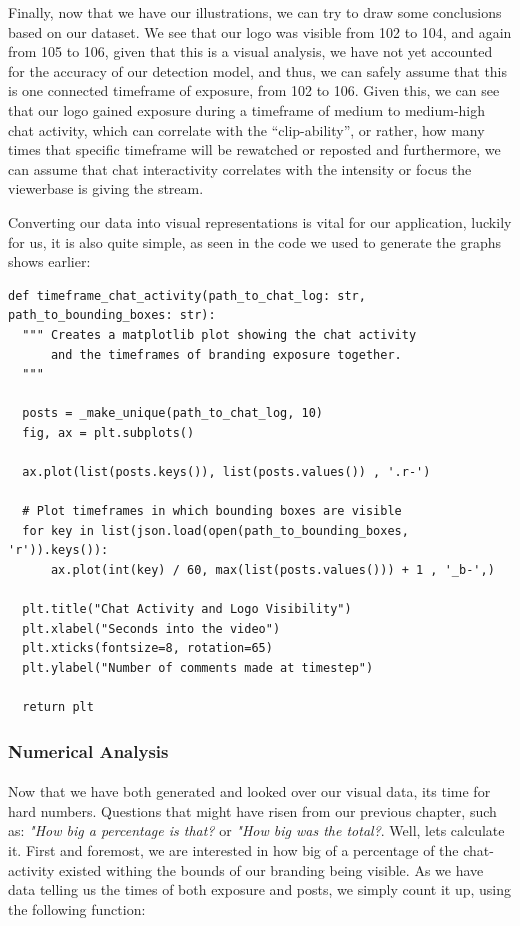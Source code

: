 \documentclass{article}
\begin{document}
Finally, now that we have our illustrations, we
can try to draw some conclusions based on our dataset.
We see that our logo was visible from 102 to 104, and
again from 105 to 106, given that this is a visual analysis,
we have not yet accounted for the accuracy of our detection
model, and thus, we can safely assume that this is one
connected timeframe of exposure, from 102 to 106.
\newline\newline
Given this, we can see that our logo gained exposure during a timeframe of medium to medium-high chat activity, which can correlate with the “clip-ability”, or rather, how many times that specific timeframe will be rewatched or reposted and furthermore, we can assume that chat interactivity correlates with the intensity or focus the viewerbase is giving the stream. 

Converting our data into visual representations is vital for our application,
luckily for us, it is also quite simple, as seen in the code we used to generate the graphs shows earlier:

\begin{lstlisting}
def timeframe_chat_activity(path_to_chat_log: str, path_to_bounding_boxes: str):
  """ Creates a matplotlib plot showing the chat activity
      and the timeframes of branding exposure together.
  """

  posts = _make_unique(path_to_chat_log, 10)
  fig, ax = plt.subplots()

  ax.plot(list(posts.keys()), list(posts.values()) , '.r-')

  # Plot timeframes in which bounding boxes are visible
  for key in list(json.load(open(path_to_bounding_boxes, 'r')).keys()):
      ax.plot(int(key) / 60, max(list(posts.values())) + 1 , '_b-',)

  plt.title("Chat Activity and Logo Visibility")
  plt.xlabel("Seconds into the video")
  plt.xticks(fontsize=8, rotation=65)
  plt.ylabel("Number of comments made at timestep")

  return plt
\end{lstlisting}

\subsubsection{Numerical Analysis}
\paragraph{}
Now that we have both generated and looked over our visual data, its time for hard numbers. Questions that might have risen from our previous chapter, such as:
\textit{"How big a percentage is that?} or
\textit{"How big was the total?}.
Well, lets calculate it. First and foremost, we are interested in how big of a percentage of the chat-activity existed withing the bounds of
our branding being visible. As we have data telling us the times of both exposure and posts, we simply count it up,
using the following function:
\end{document}
